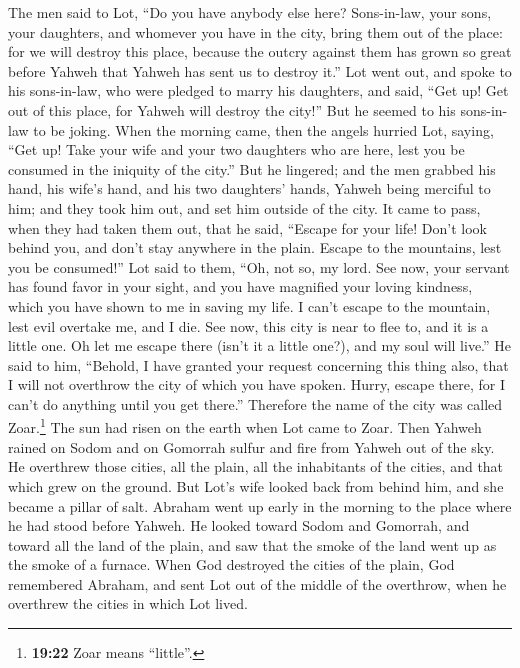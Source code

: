  The men said to Lot, ``Do you have anybody else here?
Sons-in-law, your sons, your daughters, and whomever you have in the
city, bring them out of the place:  for we will destroy
this place, because the outcry against them has grown so great before
Yahweh that Yahweh has sent us to destroy it.''  Lot went
out, and spoke to his sons-in-law, who were pledged to marry his
daughters, and said, ``Get up! Get out of this place, for Yahweh will
destroy the city!'' But he seemed to his sons-in-law to be joking.
 When the morning came, then the angels hurried Lot,
saying, ``Get up! Take your wife and your two daughters who are here,
lest you be consumed in the iniquity of the city.''  But
he lingered; and the men grabbed his hand, his wife's hand, and his two
daughters' hands, Yahweh being merciful to him; and they took him out,
and set him outside of the city.  It came to pass, when
they had taken them out, that he said, ``Escape for your life! Don't
look behind you, and don't stay anywhere in the plain. Escape to the
mountains, lest you be consumed!''  Lot said to them,
``Oh, not so, my lord.  See now, your servant has found
favor in your sight, and you have magnified your loving kindness, which
you have shown to me in saving my life. I can't escape to the mountain,
lest evil overtake me, and I die.  See now, this city is
near to flee to, and it is a little one. Oh let me escape there (isn't
it a little one?), and my soul will live.''  He said to
him, ``Behold, I have granted your request concerning this thing also,
that I will not overthrow the city of which you have spoken.
 Hurry, escape there, for I can't do anything until you
get there.'' Therefore the name of the city was called Zoar.\footnote{\textbf{19:22}
  Zoar means ``little''.}  The sun had risen on the earth
when Lot came to Zoar.  Then Yahweh rained on Sodom and
on Gomorrah sulfur and fire from Yahweh out of the sky. 
He overthrew those cities, all the plain, all the inhabitants of the
cities, and that which grew on the ground.  But Lot's
wife looked back from behind him, and she became a pillar of salt.
 Abraham went up early in the morning to the place where
he had stood before Yahweh.  He looked toward Sodom and
Gomorrah, and toward all the land of the plain, and saw that the smoke
of the land went up as the smoke of a furnace.  When God
destroyed the cities of the plain, God remembered Abraham, and sent Lot
out of the middle of the overthrow, when he overthrew the cities in
which Lot lived.


